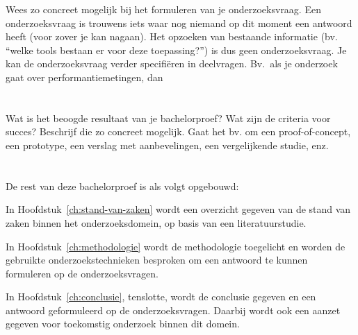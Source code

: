 Wees zo concreet mogelijk bij het formuleren van je onderzoeksvraag. Een onderzoeksvraag is trouwens iets waar nog niemand op dit moment een antwoord heeft (voor zover je kan nagaan). Het opzoeken van bestaande informatie (bv. ``welke tools bestaan er voor deze toepassing?'') is dus geen onderzoeksvraag. Je kan de onderzoeksvraag verder specifiëren in deelvragen. Bv.~als je onderzoek gaat over performantiemetingen, dan

\section{}
\label{sec:onderzoeksdoelstelling}

Wat is het beoogde resultaat van je bachelorproef? Wat zijn de criteria voor succes? Beschrijf die zo concreet mogelijk. Gaat het bv. om een proof-of-concept, een prototype, een verslag met aanbevelingen, een vergelijkende studie, enz.

\section{}
\label{sec:opzet-bachelorproef}


De rest van deze bachelorproef is als volgt opgebouwd:

In Hoofdstuk~\ref{ch:stand-van-zaken} wordt een overzicht gegeven van de stand van zaken binnen het onderzoeksdomein, op basis van een literatuurstudie.

In Hoofdstuk~\ref{ch:methodologie} wordt de methodologie toegelicht en worden de gebruikte onderzoekstechnieken besproken om een antwoord te kunnen formuleren op de onderzoeksvragen.


In Hoofdstuk~\ref{ch:conclusie}, tenslotte, wordt de conclusie gegeven en een antwoord geformuleerd op de onderzoeksvragen. Daarbij wordt ook een aanzet gegeven voor toekomstig onderzoek binnen dit domein.











